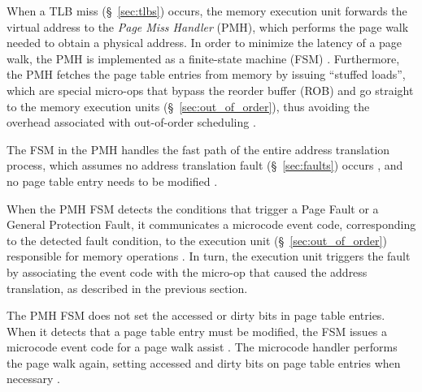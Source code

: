 When a TLB miss (\S~\ref{sec:tlbs}) occurs, the memory execution unit forwards
the virtual address to the \textit{Page Miss Handler} (PMH), which performs the
page walk needed to obtain a physical address. In order to minimize the latency
of a page walk, the PMH is implemented as a finite-state machine (FSM)
\cite{hildesheim2014ptm, raikin2014tlb}. Furthermore, the PMH fetches the
page table entries from memory by issuing ``stuffed loads'', which are special
micro-ops that bypass the reorder buffer (ROB) and go straight to the memory
execution units (\S~\ref{sec:out_of_order}), thus avoiding the overhead
associated with out-of-order scheduling
\cite{intel1997pmh, intel1997microspace, hildesheim2014ptm}.


The FSM in the PMH handles the fast path of the entire address translation
process, which assumes no address translation fault (\S~\ref{sec:faults})
occurs
\cite{intel1996dtlb, intel1997pmh, intel1999exceptions, intel1999events}, and
no page table entry needs to be modified \cite{intel1997pmh}.

When the PMH FSM detects the conditions that trigger a Page Fault or a General
Protection Fault, it communicates a microcode event code, corresponding to the
detected fault condition, to the execution unit (\S~\ref{sec:out_of_order})
responsible for memory operations \cite{intel1996dtlb, intel1997pmh,
intel1999exceptions, intel1999events}. In turn, the execution unit triggers the
fault by associating the event code with the micro-op that caused the address
translation, as described in the previous section.

The PMH FSM does not set the accessed or dirty bits in page table entries. When
it detects that a page table entry must be modified, the FSM issues a microcode
event code for a page walk assist \cite{intel1997pmh}. The microcode handler
performs the page walk again, setting accessed and dirty bits on page table
entries when necessary \cite{intel1997pmh}.

